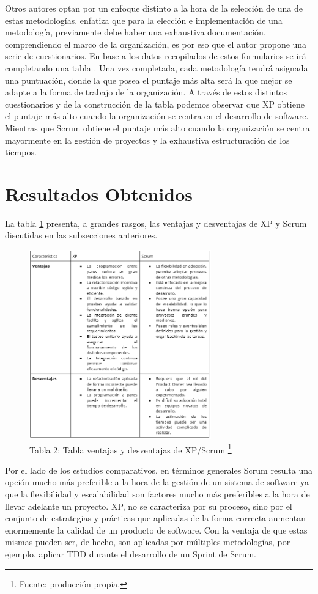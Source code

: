 \documentclass[a4paper,10pt]{article}
\begin{document}
	Otros autores optan por un enfoque distinto a la hora de la selección de una de estas metodologías. \textcite{perez2012guia} enfatiza que para la elección e implementación de una metodología, previamente debe haber una exhaustiva documentación, comprendiendo el marco de la organización, es por eso que el autor propone una serie de cuestionarios. En base a los datos recopilados de estos formularios se irá completando una tabla \parencite[61-67]{perez2012guia}. Una vez completada, cada metodología tendrá asignada una puntuación, donde la que posea el puntaje más alta será la que mejor se adapte a la forma de trabajo de la organización. A través de estos distintos cuestionarios y de la construcción de la tabla podemos observar que XP obtiene el puntaje más alto cuando la organización se centra en el desarrollo de software. Mientras que Scrum obtiene el puntaje más alto cuando la organización se centra mayormente en la gestión de proyectos y la exhaustiva estructuración de los tiempos.
	
	\section{Resultados Obtenidos}
	La tabla \ref{tabla_ventajas_desventajas} presenta, a grandes rasgos, las ventajas y desventajas de XP y Scrum discutidas en las subsecciones anteriores.
	\newpage
	\begin{figure}[h]
		\centering
		\includegraphics[width=0.7\textwidth]{tablaVentajasDesventajas.PNG}
		\caption[Tabla ventajas y desventajas]{Tabla 2: Tabla ventajas y desventajas de XP/Scrum \footnote{Fuente: producción propia.}}
		\label{tabla_ventajas_desventajas}
	\end{figure}
	Por el lado de los estudios comparativos, en términos generales Scrum resulta una opción mucho más preferible a la hora de la gestión de un sistema de software ya que la flexibilidad y escalabilidad son factores mucho más preferibles a la hora de llevar adelante un proyecto. XP, no se caracteriza por su proceso, sino por el conjunto de estrategias y prácticas que aplicadas de la forma correcta aumentan enormemente la calidad de un producto de software. Con la ventaja de que estas mismas pueden ser, de hecho, son aplicadas por múltiples metodologías, por ejemplo, aplicar TDD durante el desarrollo de un Sprint de Scrum.
\end{document}
